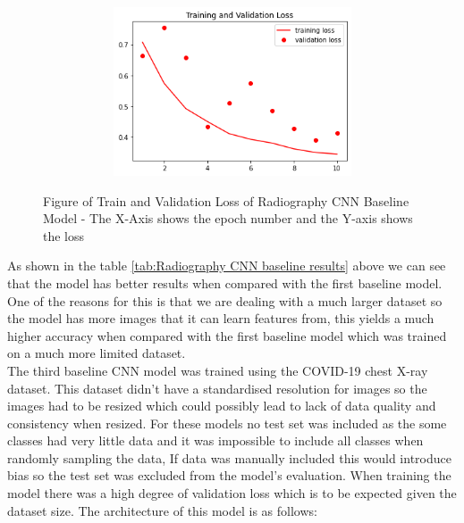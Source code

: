  \begin{figure}[H]
    \centering
    \includegraphics[width=1\textwidth,height=5cm,keepaspectratio]{Images/RadiographyCNNBaselineTrainAndValLoss.png}\\
    \caption{Figure of Train and Validation Loss of Radiography CNN Baseline Model - The X-Axis shows the epoch number and the Y-axis shows the loss}
    \label{fig:Second CNN Baseline Train and Validation Loss}
\end{figure}
As shown in the table \ref{tab:Radiography CNN baseline results} above we can see that the model has better results when compared with the first baseline model. One of the reasons for this is that we are dealing with a much larger dataset so the model has more images that it can learn features from, this yields a much higher accuracy when compared with the first baseline model which was trained on a much more limited dataset.
\\
The third baseline CNN model was trained using the COVID-19 chest X-ray dataset. This dataset didn't have a standardised resolution for images so the images had to be resized which could possibly lead to lack of data quality and consistency when resized.  For these models no test set was included as the some classes had very little data and it was impossible to include all classes when randomly sampling the data,  If data was manually included this would introduce bias so the test set was excluded from the model's evaluation.  When training the model there was a high degree of validation loss which is to be expected given the dataset size. The architecture of this model is as follows: 
